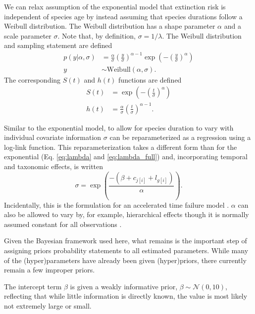 \documentclass[12pt,letterpaper]{article}
\begin{document}
We can relax assumption of the exponential model that extinction risk is independent of species age by instead assuming that species durations follow a Weibull distribution. The Weibull distribution has a shape parameter \(\alpha\) and a scale parameter \(\sigma\). Note that, by definition, \(\sigma = 1 / \lambda\). The Weibull distribution and sampling statement are defined
\begin{equation}
  \begin{aligned}
    p(y | \alpha, \sigma) &= \frac{\alpha}{\sigma} \left(\frac{y}{\sigma}\right)^{\alpha - 1} \exp\left(-\left(\frac{y}{\sigma}\right)^{\alpha}\right) \\
    y &\sim \mathrm{Weibull}(\alpha, \sigma).
  \end{aligned}
  \label{eq:weibull}
\end{equation}
The corresponding \(S(t)\) and \(h(t)\) functions are defined
\begin{align}
  S(t) &= \exp\left(-\left(\frac{t}{\sigma}\right)^{\alpha}\right) \label{eq:wei_surv} \\
  h(t) &= \frac{\alpha}{\sigma}\left(\frac{t}{\sigma}\right)^{\alpha - 1} \label{eq:wei_haz}.
\end{align}

Similar to the exponential model, to allow for species duration to vary with individual covariate information \(\sigma\) can be reparameterized as a regression \citep{Klein2003} using a log-link function. This reparameterization takes a different form than for the exponential (Eq. \ref{eq:lambda} and \ref{eq:lambda_full}) and, incorporating temporal and taxonomic effects, is written
\begin{equation}
  \sigma = \exp\left(\frac{-(\beta + c_{j[i]} + l_{g[i]})}{\alpha}\right).
  \label{eq:sigma_full}
\end{equation}
Incidentally, this is the formulation for an accelerated time failure model \citep{Klein2003}. \(\alpha\) can also be allowed to vary by, for example, hierarchical effects though it is normally assumed constant for all observations \citep{Klein2003}.


Given the Bayesian framework used here, what remains is the important step of assigning priors probability statements to all estimated parameters. While many of the (hyper)parameters have already been given (hyper)priors, there currently remain a few improper priors.

The intercept term \(\beta\) is given a weakly informative prior, \(\beta \sim \mathcal{N}(0, 10)\), reflecting that while little information is directly known, the value is most likely not extremely large or small.
\end{document}
